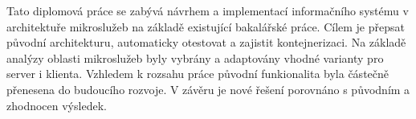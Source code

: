 Tato diplomová práce se zabývá návrhem a implementací informačního systému v architektuře mikroslužeb na základě existující bakalářské práce.
Cílem je přepsat původní architekturu, automaticky otestovat a zajistit kontejnerizaci.
Na základě analýzy oblasti mikroslužeb byly vybrány a adaptovány vhodné varianty pro server i klienta.
Vzhledem k rozsahu práce původní funkionalita byla částečně přenesena do budoucího rozvoje.
V závěru je nové řešení porovnáno s původním a zhodnocen výsledek.
